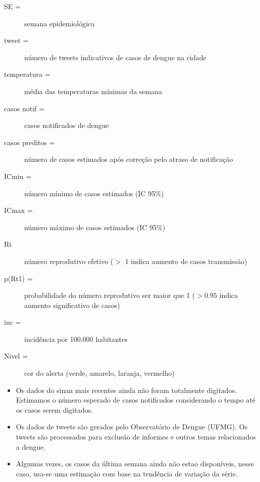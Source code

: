 \documentclass[10pt]{article} %
\begin{document}
      \BackToContents %


\newpage


\begin{minipage}[t]{1\linewidth} 

\hypertarget{vartab}{}

\begin{description}
\item [SE =] semana epidemiológica
\item [tweet =] número de tweets indicativos de casos de dengue na cidade
\item [temperatura =] média das temperaturas mínimas da semana
\item [casos notif =] casos notificados de dengue 
\item [casos preditos =] número de casos estimados após correção pelo atraso de notificação
\item [ICmin =] número mínimo de casos estimados (IC 95\%)
\item [ICmax =] número máximo de casos estimados (IC 95\%)
\item [Rt] número reprodutivo efetivo ($>$ 1 indica aumento de casos transmissão)
\item [p(Rt1) =] probabilidade do número reprodutivo ser maior que 1 ($>0.95$ indica aumento significativo de casos)
\item [inc =] incidência por 100.000 habitantes
\item [Nivel =] cor do alerta (verde, amarelo, laranja, vermelho)
\end{description}

\hypertarget{notas}{}

\begin{itemize}
\item Os dados do sinan mais recentes ainda não foram totalmente digitados. Estimamos o número esperado de casos notificados considerando o tempo até os casos serem digitados.
\item Os dados de tweets são gerados pelo Observatório de Dengue (UFMG). Os tweets são processados para exclusão de informes e outros temas relacionados a dengue.
\item Algumas vezes, os casos da última semana ainda não estao disponíveis, nesse caso, usa-se uma estimação com base na tendência de variação da série.
\end{itemize}


\end{minipage}
\end{document}
